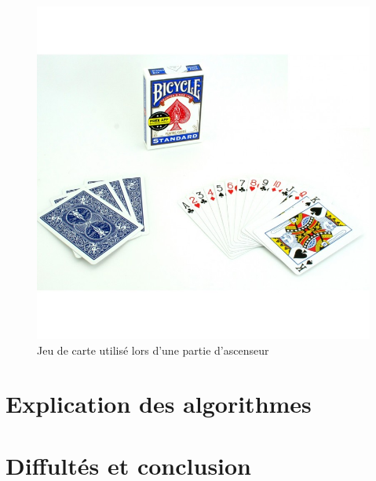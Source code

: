 \documentclass[12pt]{report}
\begin{document}
\begin{itemize}
	\begin{figure}
	\includegraphics[scale=0.30]{jeu-de-cartes-magicien-bicycle-stripper.jpg}
	 \caption{Jeu de carte utilisé lors d'une partie d'ascenseur}
	\end{figure}
		

		
\clearpage

		
\section{Explication des algorithmes}

\section{Diffultés et conclusion}
			
	\end{itemize}
\end{document}
